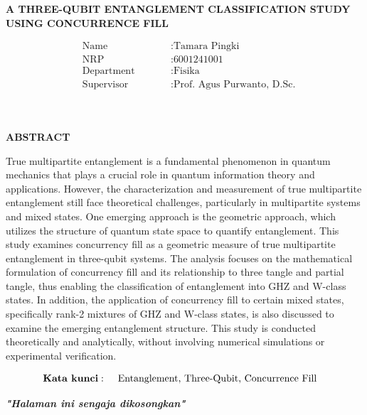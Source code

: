 \begin{center}
	\large{\textbf{A THREE-QUBIT ENTANGLEMENT CLASSIFICATION STUDY USING CONCURRENCE FILL}}
\end{center}
\begin{minipage}{4cm}
	\begin{align*}
		&\text{Name} \qquad &&: \text{Tamara Pingki} \\
		&\text{NRP} \qquad &&: \text{6001241001} \\
		&\text{Department} \qquad &&: \text{Fisika} \\
		&\text{Supervisor} \qquad &&: \text{Prof. Agus Purwanto, D.Sc.} \\
	\end{align*}
\end{minipage} \\
\begin{center}
	\large\textbf{ABSTRACT} \\  
\end{center}
True multipartite entanglement is a fundamental phenomenon in quantum mechanics that plays a crucial role in quantum information theory and applications. However, the characterization and measurement of true multipartite entanglement still face theoretical challenges, particularly in multipartite systems and mixed states. One emerging approach is the geometric approach, which utilizes the structure of quantum state space to quantify entanglement. This study examines concurrency fill as a geometric measure of true multipartite entanglement in three-qubit systems. The analysis focuses on the mathematical formulation of concurrency fill and its relationship to three tangle and partial tangle, thus enabling the classification of entanglement into GHZ and W-class states. In addition, the application of concurrency fill to certain mixed states, specifically rank-2 mixtures of GHZ and W-class states, is also discussed to examine the emerging entanglement structure. This study is conducted theoretically and analytically, without involving numerical simulations or experimental verification.

\noindent
\begin{minipage}{1cm}
	\begin{align*}
		\text{\textbf{Kata kunci}}:\hspace{5mm}&\text{Entanglement, Three-Qubit, Concurrence Fill}%
	\end{align*}
\end{minipage}


\newpage
\thispagestyle{empty}
\begin{center}
	\vspace*{\fill}
	\textit{\textbf{"Halaman ini sengaja dikosongkan"}}
	\vspace*{\fill}
\end{center}
\pagebreak